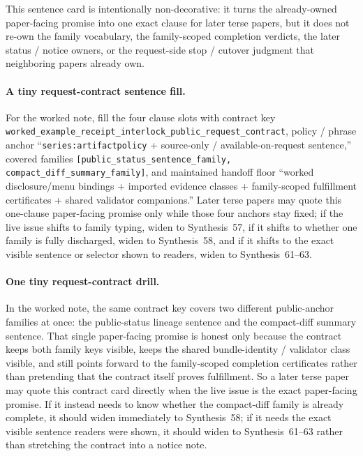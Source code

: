 \documentclass[11pt]{article}
\begin{document}
This sentence card is intentionally non-decorative: it turns the already-owned paper-facing promise into one exact clause for later terse papers, but it does not re-own the family vocabulary, the family-scoped completion verdicts, the later status / notice owners, or the request-side stop / cutover judgment that neighboring papers already own.\cite{series:workedexample}

\paragraph{A tiny request-contract sentence fill.}
For the worked note, fill the four clause slots with contract key \nolinkurl{worked_example_receipt_interlock_public_request_contract}, policy / phrase anchor ``\texttt{series:artifactpolicy} + source-only / available-on-request sentence,'' covered families \nolinkurl{[public_status_sentence_family, compact_diff_summary_family]}, and maintained handoff floor ``worked disclosure/menu bindings + imported evidence classes + family-scoped fulfillment certificates + shared validator companions.'' Later terse papers may quote this one-clause paper-facing promise only while those four anchors stay fixed; if the live issue shifts to family typing, widen to Synthesis~57, if it shifts to whether one family is fully discharged, widen to Synthesis~58, and if it shifts to the exact visible sentence or selector shown to readers, widen to Synthesis~61--63.\cite{series:workedexample}

\paragraph{One tiny request-contract drill.}
In the worked note, the same contract key covers two different public-anchor families at once: the public-status lineage sentence and the compact-diff summary sentence. That single paper-facing promise is honest only because the contract keeps both family keys visible, keeps the shared bundle-identity / validator class visible, and still points forward to the family-scoped completion certificates rather than pretending that the contract itself proves fulfillment. So a later terse paper may quote this contract card directly when the live issue is the exact paper-facing promise. If it instead needs to know whether the compact-diff family is already complete, it should widen immediately to Synthesis~58; if it needs the exact visible sentence readers were shown, it should widen to Synthesis~61--63 rather than stretching the contract into a notice note.\cite{series:workedexample}
\end{document}
